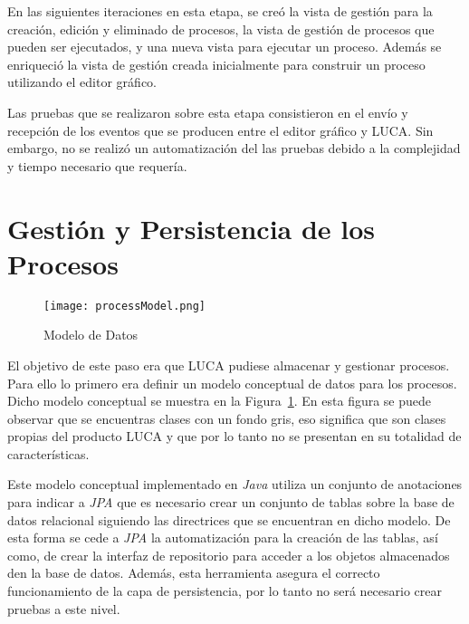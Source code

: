 En las siguientes iteraciones en esta etapa, se creó la vista de gestión para la creación, edición y eliminado de procesos, la vista de gestión de procesos que pueden ser ejecutados, y una nueva vista para ejecutar un proceso. Además se enriqueció la vista de gestión creada inicialmente para construir un proceso utilizando el editor gráfico.

Las pruebas que se realizaron sobre esta etapa consistieron en el envío y recepción de los eventos que se producen entre el editor gráfico y LUCA. Sin embargo, no se realizó un automatización del las pruebas debido a la complejidad y tiempo necesario que requería.

\section{Gestión y Persistencia de los Procesos}

\begin{figure}[!tb]
	\centering
	\texttt{[image: processModel.png]}
	\caption{Modelo de Datos}
	\label{fig:processModel}
\end{figure}

El objetivo de este paso era que LUCA pudiese almacenar y gestionar procesos. Para ello lo primero era definir un modelo conceptual de datos para los procesos. Dicho modelo conceptual se muestra en la Figura~\ref{fig:processModel}. En esta figura se puede observar que se encuentras clases con un fondo gris, eso significa que son clases propias del producto LUCA y que por lo tanto no se presentan en su totalidad de características.

Este modelo conceptual implementado en \emph{Java} utiliza un conjunto de anotaciones para indicar a \emph{JPA}\cite{jpa} que es necesario crear un conjunto de tablas sobre la base de datos relacional siguiendo las directrices que se encuentran en dicho modelo. De esta forma se cede a \emph{JPA} la automatización para la creación de las tablas, así como, de crear la interfaz de repositorio para acceder a los objetos almacenados den la base de datos. Además, esta herramienta asegura el correcto funcionamiento de la capa de persistencia, por lo tanto no será necesario crear pruebas a este nivel.

